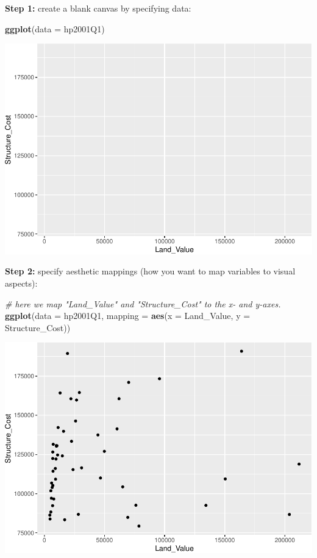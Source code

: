 \documentclass[
]{book}
\newenvironment{Shaded}{\begin{snugshade}}{\end{snugshade}}
\newcommand{\CommentTok}[1]{\textcolor[rgb]{0.56,0.35,0.01}{\textit{#1}}}
\newcommand{\DataTypeTok}[1]{\textcolor[rgb]{0.13,0.29,0.53}{#1}}
\newcommand{\KeywordTok}[1]{\textcolor[rgb]{0.13,0.29,0.53}{\textbf{#1}}}
\newcommand{\NormalTok}[1]{#1}
\begin{document}
\textbf{Step 1:} create a blank canvas by specifying data:

\begin{Shaded}
\begin{Highlighting}[]
\KeywordTok{ggplot}\NormalTok{(}\DataTypeTok{data =}\NormalTok{ hp2001Q1)}
\end{Highlighting}
\end{Shaded}

\includegraphics{R/Rgraphics/figures/unnamed-chunk-143-1.pdf}

\textbf{Step 2:} specify aesthetic mappings (how you want to map variables to visual aspects):

\begin{Shaded}
\begin{Highlighting}[]
\CommentTok{\# here we map "Land\_Value" and "Structure\_Cost" to the x{-} and y{-}axes.}
\KeywordTok{ggplot}\NormalTok{(}\DataTypeTok{data =}\NormalTok{ hp2001Q1, }\DataTypeTok{mapping =} \KeywordTok{aes}\NormalTok{(}\DataTypeTok{x =}\NormalTok{ Land\_Value, }\DataTypeTok{y =}\NormalTok{ Structure\_Cost))}
\end{Highlighting}
\end{Shaded}

\includegraphics{R/Rgraphics/figures/unnamed-chunk-144-1.pdf}
\end{document}
